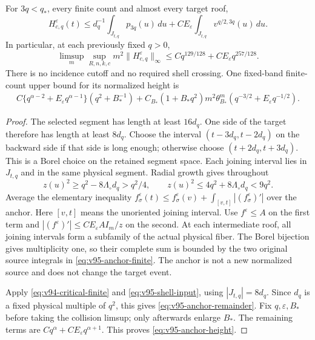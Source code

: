 \begin{theorem}
\label{thm:v95-anchor}
For $3q<q_*$, every finite count and almost every target roof,
\begin{equation}\label{eq:v95-anchor-finite}
 H_{c,q}^\varepsilon(t)
 \le d_q^{-1}\int_{J_{t,q}}p_{3q}(u)\,du
       +C E_\varepsilon\int_{J_{t,q}}v^{q/2,3q}(u)\,du.
\end{equation}
In particular, at each previously fixed $q>0$,
\begin{equation}\label{eq:v95-anchor-height}
 \limsup_m\sup_{R,n,k,c}m^2\|H_{c,q}^\varepsilon\|_\infty
       \le C q^{129/128}+C E_\varepsilon q^{257/128}.
\end{equation}
There is no incidence cutoff and no required shell crossing.
One fixed-band finite-count upper bound for its normalized height is
\begin{align}
 C\{q^{\alpha-2}+E_\varepsilon q^{\alpha-1}\}(q^2+B_*^{-1})
 +C_{B_*}(1+B_*q^2)m^2\theta_{B_*}^m
                  (q^{-3/2}+E_\varepsilon q^{-1/2}).
 \label{eq:v95-anchor-remainder}
\end{align}
\end{theorem}
\begin{proof}
The selected segment has length at least $16d_q$. One side of the
target therefore has length at least $8d_q$. Choose the interval
$(t-3d_q,t-2d_q)$ on the backward side if that side is long enough;
otherwise choose $(t+2d_q,t+3d_q)$. This is a Borel choice on the
retained segment space. Each joining interval lies in $J_{t,q}$
and in the same physical segment. Radial growth gives throughout
\[
 z(u)^2\ge q^2-8\Lambda_\circ d_q>q^2/4,
 \qquad z(u)^2\le4q^2+8\Lambda_\circ d_q<9q^2.
\]
Average the elementary inequality
$f_\sigma^\varepsilon(t)\le f_\sigma^\varepsilon(v)
+\int_{[v,t]}|(f_\sigma^\varepsilon)'|$
over the anchor. Here $[v,t]$ means the unoriented joining interval.
Use $f^\varepsilon\le A$ on the first term and
$|(f^\varepsilon)'|\le C E_\varepsilon A I_m/z$ on the second.
At each intermediate roof, all joining intervals form a subfamily of
the actual physical fiber. The Borel bijection gives multiplicity one,
so their complete sum is bounded by the two original source integrals
in \eqref{eq:v95-anchor-finite}. The anchor is not a new normalized
source and does not change the target event.

Apply \eqref{eq:v94-critical-finite} and
\eqref{eq:v95-shell-input}, using $|J_{t,q}|=8d_q$.
Since $d_q$ is a fixed physical multiple of $q^2$, this gives
\eqref{eq:v95-anchor-remainder}. Fix $q,\varepsilon,B_*$ before
taking the collision limsup; only afterwards enlarge $B_*$. The
remaining terms are $Cq^\alpha+C E_\varepsilon q^{\alpha+1}$.
This proves \eqref{eq:v95-anchor-height}.
\end{proof}

